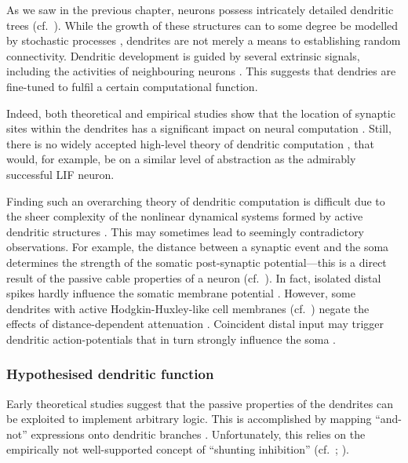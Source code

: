 

As we saw in the previous chapter, neurons possess intricately detailed dendritic trees (cf.~).
While the growth of these structures can to some degree be modelled by stochastic processes \citep[e.g.,][]{nowakowski1992competitive}, dendrites are not merely a means to establishing random connectivity.
Dendritic development is guided by several extrinsic signals, including the activities of neighbouring neurons \citep{mcallister2000cellular}.
This suggests that dendries are fine-tuned to fulfil a certain computational function.

Indeed, both theoretical and empirical studies show that the location of synaptic sites within the dendrites has a significant impact on neural computation \citep{mel1994information,koch2002singlecell,polsky2004computational}.
Still, there is no widely accepted high-level theory of dendritic computation \citep{london2005dendritic}, that would, for example, be on a similar level of abstraction as the admirably successful LIF neuron.

Finding such an overarching theory of dendritic computation is difficult due to the sheer complexity of the nonlinear dynamical systems formed by active dendritic structures \citep{beniaguev2021single}.
This may sometimes lead to seemingly contradictory observations.
For example, the distance between a synaptic event and the soma determines the strength of the somatic post-synaptic potential---this is a direct result of the passive cable properties of a neuron (cf.~).
In fact, isolated distal spikes hardly influence the somatic membrane potential \citep{stuart1998determinants}.
However, some dendrites with active Hodgkin-Huxley-like cell membranes (cf.~) negate the effects of distance-dependent attenuation \citep{koch2002singlecell}.
Coincident distal input may trigger dendritic action-potentials that in turn strongly influence the soma \citep{williams2002dependence}.

\subsubsection{Hypothesised dendritic function}
Early theoretical studies suggest that the passive properties of the dendrites can be exploited to implement arbitrary logic.
This is accomplished by mapping \enquote{and-not} expressions onto dendritic branches \citep{koch1983nonlinear,mel1994information,london2005dendritic}.
Unfortunately, this relies on the empirically not well-supported concept of \enquote{shunting inhibition} (cf.~; \cite{holt1997shunting,abbott2005drivers}).

